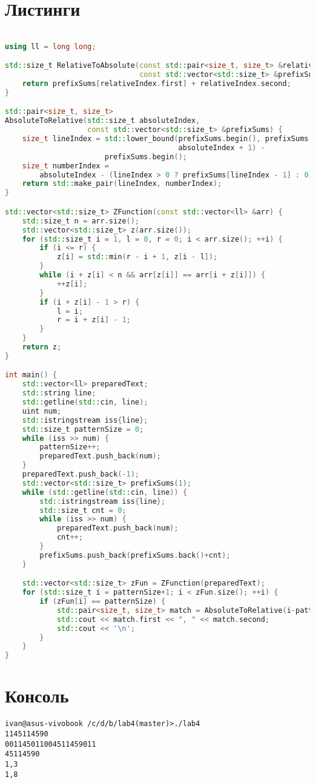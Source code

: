 \section{Листинги}

\begin{lstlisting}[language=C++]

using ll = long long;

std::size_t RelativeToAbsolute(const std::pair<size_t, size_t> &relativeIndex,
                               const std::vector<std::size_t> &prefixSums) {
    return prefixSums[relativeIndex.first] + relativeIndex.second;
}

std::pair<size_t, size_t>
AbsoluteToRelative(std::size_t absoluteIndex,
                   const std::vector<std::size_t> &prefixSums) {
    size_t lineIndex = std::lower_bound(prefixSums.begin(), prefixSums.end(),
                                        absoluteIndex + 1) -
                       prefixSums.begin();
    size_t numberIndex =
        absoluteIndex - (lineIndex > 0 ? prefixSums[lineIndex - 1] : 0) + 1;
    return std::make_pair(lineIndex, numberIndex);
}

std::vector<std::size_t> ZFunction(const std::vector<ll> &arr) {
    std::size_t n = arr.size();
    std::vector<std::size_t> z(arr.size());
    for (std::size_t i = 1, l = 0, r = 0; i < arr.size(); ++i) {
        if (i <= r) {
            z[i] = std::min(r - i + 1, z[i - l]);
        }
        while (i + z[i] < n && arr[z[i]] == arr[i + z[i]]) {
            ++z[i];
        }
        if (i + z[i] - 1 > r) {
            l = i;
            r = i + z[i] - 1;
        }
    }
    return z;
}

int main() {
    std::vector<ll> preparedText;
    std::string line;
    std::getline(std::cin, line);
    uint num;
    std::istringstream iss{line};
    std::size_t patternSize = 0;
    while (iss >> num) {
        patternSize++;
        preparedText.push_back(num);
    }
    preparedText.push_back(-1);
    std::vector<std::size_t> prefixSums(1);
    while (std::getline(std::cin, line)) {
        std::istringstream iss{line};
        std::size_t cnt = 0;
        while (iss >> num) {
            preparedText.push_back(num);
            cnt++;
        }
        prefixSums.push_back(prefixSums.back()+cnt);
    }

    std::vector<std::size_t> zFun = ZFunction(preparedText);
    for (std::size_t i = patternSize+1; i < zFun.size(); ++i) {
        if (zFun[i] == patternSize) {
            std::pair<size_t, size_t> match = AbsoluteToRelative(i-patternSize-1, prefixSums);
            std::cout << match.first << ", " << match.second;
            std::cout << '\n';
        }
    }
}
\end{lstlisting}

\section{Консоль}
\begin{alltt}
ivan@asus-vivobook ~/c/d/b/lab4 (master)> ./lab4
11 45 11 45 90
0011 45 011 0045 11 45 90    11
45 11 45 90
1, 3
1, 8
\end{alltt}
\pagebreak
